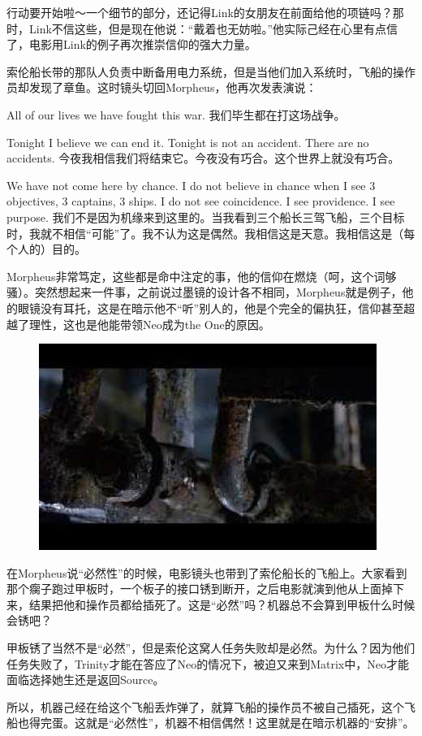 \documentclass[UTF8]{ctexart}
\begin{document}
行动要开始啦～一个细节的部分，还记得Link的女朋友在前面给他的项链吗？那时，Link不信这些，但是现在他说：“戴着也无妨啦。”他实际己经在心里有点信了，电影用Link的例子再次推崇信仰的强大力量。

索伦船长带的那队人负责中断备用电力系统，但是当他们加入系统时，飞船的操作员却发现了章鱼。这时镜头切回Morpheus，他再次发表演说：

All of our lives we have fought this war. 我们毕生都在打这场战争。

Tonight I believe we can end it. Tonight is not an accident. There are no accidents. 今夜我相信我们将结束它。今夜没有巧合。这个世界上就没有巧合。

We have not come here by chance. I do not believe in chance when I see 3 objectives, 3 captains, 3 ships. I do not see coincidence. I see providence. I see purpose. 我们不是因为机缘来到这里的。当我看到三个船长三驾飞船，三个目标时，我就不相信“可能”了。我不认为这是偶然。我相信这是天意。我相信这是（每个人的）目的。

Morpheus非常笃定，这些都是命中注定的事，他的信仰在燃烧（呵，这个词够骚）。突然想起来一件事，之前说过墨镜的设计各不相同，Morpheus就是例子，他的眼镜没有耳托，这是在暗示他不“听”别人的，他是个完全的偏执狂，信仰甚至超越了理性，这也是他能带领Neo成为the One的原因。

\begin{figure}[htb]
\centering
\includegraphics[width=0.5\linewidth]{fig/read_reloaded-148}
\end{figure}

在Morpheus说“必然性”的时候，电影镜头也带到了索伦船长的飞船上。大家看到那个瘸子跑过甲板时，一个板子的接口锈到断开，之后电影就演到他从上面掉下来，结果把他和操作员都给插死了。这是“必然”吗？机器总不会算到甲板什么时候会锈吧？

甲板锈了当然不是“必然”，但是索伦这窝人任务失败却是必然。为什么？因为他们任务失败了，Trinity才能在答应了Neo的情况下，被迫又来到Matrix中，Neo才能面临选择她生还是返回Source。

所以，机器己经在给这个飞船丢炸弹了，就算飞船的操作员不被自己插死，这个飞船也得完蛋。这就是“必然性”，机器不相信偶然！这里就是在暗示机器的“安排”。
\end{document}
